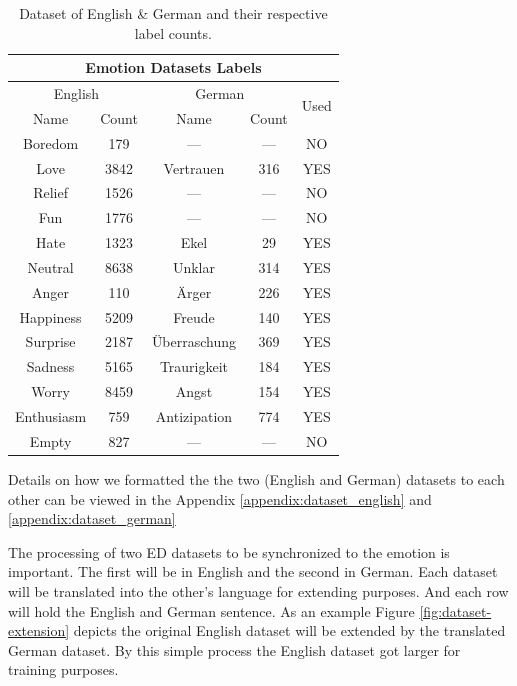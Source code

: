 \documentclass[11pt]{article}
\begin{document}
\begin{table}[h!]
\centering
\begin{tabular}{ | c c | c c | c | }
    \hline
    \multicolumn{5}{|c|}{Emotion Datasets Labels} \\
    
    \hline
    \multicolumn{2}{|c|}{English} & \multicolumn{2}{c|}{German} & \multirow{2}{*}{Used} \\
    Name & Count & Name & Count \\
    \hline
    Boredom    &  179 & ---           & --- & NO  \\
    Love       & 3842 & Vertrauen     & 316 & YES \\
    Relief     & 1526 & ---           & --- & NO  \\ 
    Fun        & 1776 & ---           & --- & NO  \\
    Hate       & 1323 & Ekel          &  29 & YES \\
    Neutral    & 8638 & Unklar        & 314 & YES \\
    Anger      &  110 & Ärger         & 226 & YES \\
    Happiness  & 5209 & Freude        & 140 & YES \\
    Surprise   & 2187 & Überraschung  & 369 & YES \\
    Sadness    & 5165 & Traurigkeit   & 184 & YES \\
    Worry      & 8459 & Angst         & 154 & YES \\
    Enthusiasm &  759 & Antizipation  & 774 & YES \\
    Empty      &  827 & ---           & --- & NO  \\
    \hline
\end{tabular}
\caption{Dataset of English \& German and their respective label counts.}
\label{table:dataset_labels}
\end{table}

Details on how we formatted the the two (English and German) datasets to each other can be viewed in the Appendix \ref{appendix:dataset_english} and \ref{appendix:dataset_german}

The processing of two ED datasets to be synchronized to the emotion is important. The first will be in English and the second in German. Each dataset will be translated into the other’s language for extending purposes. And each row will hold the English and German sentence. As an example Figure \ref{fig:dataset-extension} depicts the original English dataset will be extended by the translated German dataset. By this simple process the English dataset got larger for training purposes.
\end{document}
